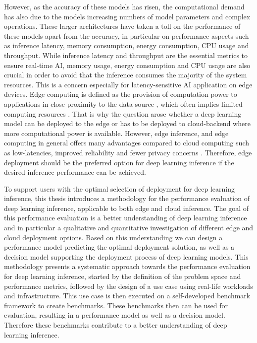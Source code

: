 However, as the accuracy of these models has risen, the computational demand has also due to the models increasing numbers of model parameters and complex operations.
These larger architectures have taken a toll on the performance of these models apart from the accuracy, in particular on performance aspects such as inference latency, memory consumption, energy consumption, CPU usage and throughput. 
While inference latency and throughput are the essential metrics to ensure real-time AI, memory usage, energy consumption and CPU usage are also crucial in order to avoid that the inference consumes the majority of the system resources.
This is a concern especially for latency-sensitive AI application on edge devices.
Edge computing is defined as the provision of computation power to applications in close proximity to the data source \cite{DBLP:journals/corr/abs-1808-05283}, which often implies limited computing resources \cite{DBLP:journals/corr/abs-1811-11268}. 
That is why the question arose whether a deep learning model can be deployed to the edge or has to be deployed to cloud-backend where more computational power is available.
However, edge inference, and edge computing in general offers many advantages compared to cloud computing such as low-latencies, improved reliability and fewer privacy concerns \cite{Mor:2018:EC:3305263.3313377}.
Therefore, edge deployment should be the preferred option for deep learning inference if the desired inference performance can be achieved.



To support users with the optimal selection of deployment for deep learning inference, this thesis introduces a methodology for the performance evaluation of deep learning inference, applicable to both edge and cloud inference.
The goal of this performance evaluation is a better understanding of deep learning inference and in particular a qualitative and quantitative investigation of different edge and cloud deployment options.
Based on this understanding we can design a performance model predicting the optimal deployment solution, as well as a decision model supporting the deployment process of deep learning models.
This methodology presents a systematic approach towards the performance evaluation for deep learning inference, started by the definition of the problem space and performance metrics, followed by the design of a use case using real-life workloads and infrastructure. This use case is then executed on a self-developed benchmark framework to create benchmarks.
These benchmarks then can be used for evaluation, resulting in a performance model as well as a decision model. Therefore these benchmarks contribute to a better understanding of deep learning inference.


